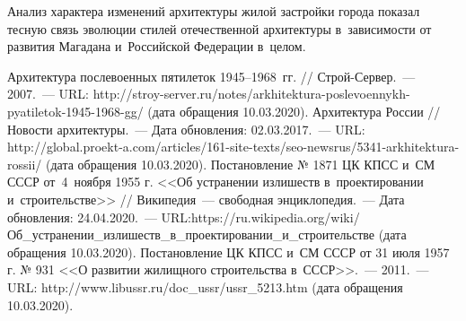 Анализ характера изменений архитектуры жилой застройки города показал тесную связь эволюции стилей отечественной архитектуры в~зависимости от развития Магадана и~Российской Федерации в~целом.

\begin{thebibliography}{99}
\bibitem{}Архитектура послевоенных пятилеток 1945--1968~гг. // Строй-Сервер.~--- 2007.~--- URL: http://stroy-server.ru/notes/arkhitektura-poslevoennykh-pyatiletok-1945-1968-gg/ (дата обращения 10.03.2020).
\bibitem{}Архитектура России // Новости архитектуры.~--- Дата обновления: 02.03.2017.~--- URL: http://global.proekt-a.com/articles/161-site-texts/seo-newsrus/5341-arkhitektura-rossii/ (дата обращения 10.03.2020).
\bibitem{}Постановление № 1871 ЦК КПСС и~СМ СССР от 4 ноября 1955 г. <<Об устранении излишеств в~проектировании и~строительстве>> // Википедия~--- свободная энциклопедия.~--- Дата обновления: 24.04.2020.~--- URL:https://ru.wikipedia.org/wiki/Об\_устранении\_излишеств\_в\_про\-ек\-ти\-ро\-ван\-ии\_и\_строительстве (дата обращения 10.03.2020).
\bibitem{}Постановление ЦК КПСС и~СМ СССР от 31 июля 1957 г. № 931 <<О развитии жилищного строительства в~СССР>>.~--- 2011.~--- URL: http://www.libussr.ru/doc\_ussr/ussr\_5213.htm (дата обращения 10.03.2020).

\end{thebibliography}
